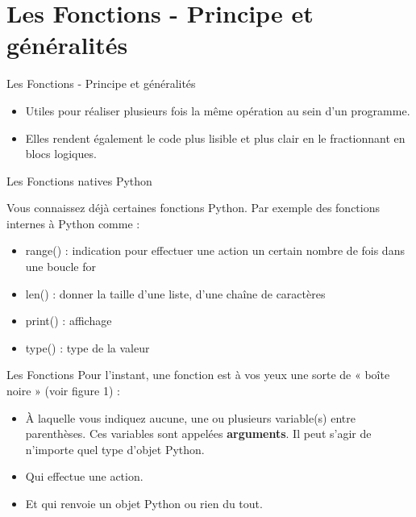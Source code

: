\section{Les Fonctions - Principe et généralités}

\begin{frame}{Les Fonctions - Principe et généralités}

\begin{itemize}[label=\textbullet, font= \color{greenperso}]
    \item Utiles pour réaliser plusieurs fois la même opération au sein d'un programme. 
    \item Elles rendent également le code plus lisible et plus clair en le fractionnant en blocs logiques.
\end{itemize}
\end{frame}


\begin{frame}{Les Fonctions natives Python}
    

Vous connaissez déjà certaines fonctions Python. Par exemple des fonctions internes à Python comme :

\begin{itemize}[label=\textbullet, font= \color{greenperso}]
    \item range() : indication pour effectuer une action un certain nombre de fois dans une boucle for
    \item len() : donner la taille d'une liste, d'une chaîne de caractères
    \item print() : affichage
    \item type() : type de la valeur 
\end{itemize}
\end{frame}



\begin{frame}{Les Fonctions}
Pour l'instant, une fonction est à vos yeux une sorte de « boîte noire » (voir figure 1) :
\begin{itemize}[label=\textbullet, font= \color{greenperso}]
    \item À laquelle vous indiquez aucune, une ou plusieurs variable(s) entre parenthèses. Ces variables sont appelées \textbf{arguments}. Il peut s'agir de n'importe quel type d'objet Python.

 \item Qui effectue une action.
\item Et qui renvoie un objet Python ou rien du tout.
\end{itemize}
\end{frame}


